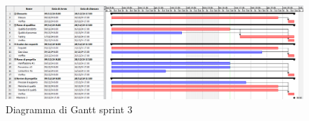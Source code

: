         \begin{figure}[h!]
            \centering
            \includegraphics[scale = 0.3]{template/images/gantt3.png}
            \caption{Diagramma di Gantt sprint 3}
            \label{fig:3.3} %
        \end{figure}
 
